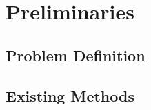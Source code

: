 \chapter{Preliminaries}
\label{chap:preliminaries}

\section{Problem Definition}
\label{sec:problem}

\section{Existing Methods}
\label{sec:existing-method}

